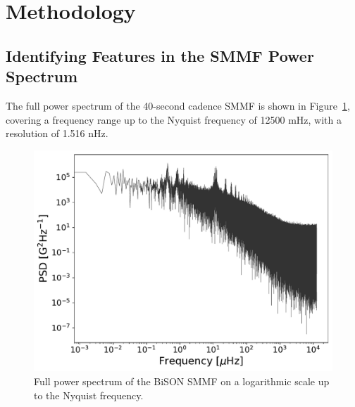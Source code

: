




\section{Methodology}\label{sec:SMMF_method}


\subsection{Identifying Features in the SMMF Power Spectrum}

The full power spectrum of the 40-second cadence SMMF is shown in Figure~\ref{fig:BiSON_FT_full}, covering a frequency range up to the Nyquist frequency of 12500 mHz, with a resolution of 1.516 nHz. 

\begin{figure}[ht!]
	\centering
	\includegraphics[width=\columnwidth]{BiSON_SMMF_FT_full.pdf}
	\caption{Full power spectrum of the BiSON SMMF on a logarithmic scale up to the Nyquist frequency.}
	\label{fig:BiSON_FT_full}
\end{figure}

